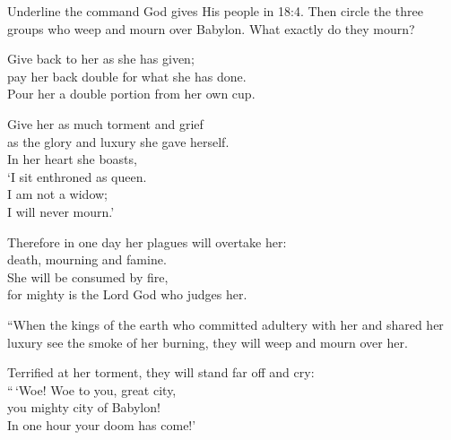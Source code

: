 \begin{ScriptureBox2}{Underline the command God gives His people in 18:4. Then circle the three groups who weep and mourn over Babylon. What exactly do they mourn?}
\item[18:6] \hspace*{1em}Give back to her as she has given;\\
\hspace*{2em}pay her back double for what she has done.\\
\hspace*{2em}Pour her a double portion from her own cup.

\item[18:7] \hspace*{1em}Give her as much torment and grief\\
\hspace*{2em}as the glory and luxury she gave herself.\\
\hspace*{1em}In her heart she boasts,\\
\hspace*{2em}`I sit enthroned as queen.\\
\hspace*{1em}I am not a widow;\\
\hspace*{2em}I will never mourn.'

\item[18:8] \hspace*{1em}Therefore in one day her plagues will overtake her:\\
\hspace*{2em}death, mourning and famine.\\
\hspace*{1em}She will be consumed by fire,\\
\hspace*{2em}for mighty is the Lord God who judges her.

\item[18:9] ``When the kings of the earth who committed adultery with her and shared her luxury see the smoke of her burning, they will weep and mourn over her.

\item[18:10] Terrified at her torment, they will stand far off and cry:\\
\hspace*{1em}``\,`Woe! Woe to you, great city,\\
\hspace*{2em}you mighty city of Babylon!\\
\hspace*{1em}In one hour your doom has come!'


\end{ScriptureBox2}
